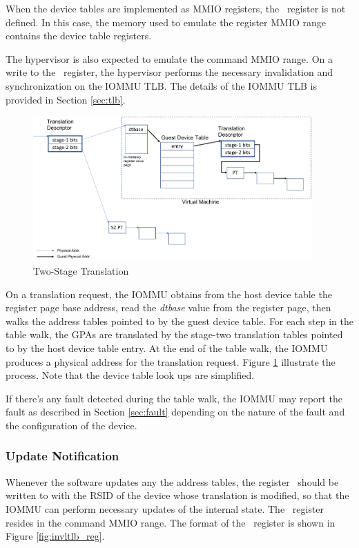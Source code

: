 When the device tables are implemented as MMIO registers, the \dtbase\ register is not
defined. In this case, the memory used to emulate the register MMIO range contains the
device table registers.

The hypervisor is also expected to emulate the command MMIO range. On a write to the
\invltlb\ register, the hypervisor performs the necessary invalidation and
synchronization on the IOMMU TLB. The details of the IOMMU TLB is provided in Section
\ref{sec:tlb}.

\begin{figure}[ht!]
    \centering
    \includegraphics[width=0.95\textwidth]{img/two-stage-trans.pdf}
    \caption{Two-Stage Translation}
    \label{fig:two-stage-trans}
\end{figure}

On a translation request, the IOMMU obtains from the host device table the register page
base address, read the \textit{dtbase} value from the register page, then walks the
address tables pointed to by the guest device table. For each step in the table walk, the
GPAs are translated by the stage-two translation tables pointed to by the host device
table entry. At the end of the table walk, the IOMMU produces a physical address for the
translation request. Figure \ref{fig:two-stage-trans} illustrate the process. Note that
the device table look ups are simplified. 

If there's any fault detected during the table walk, the IOMMU may report the fault as
described in Section \ref{sec:fault} depending on the nature of the fault and the
configuration of the device.


\subsubsection{Update Notification}

Whenever the software updates any the address tables, the register \invltlb\ should be
written to with the RSID of the device whose translation is modified, so that the IOMMU
can perform necessary updates of the internal state. The \invltlb\ register resides in the
command MMIO range. The format of the \invltlb\ register is shown in Figure
\ref{fig:invltlb_reg}.

